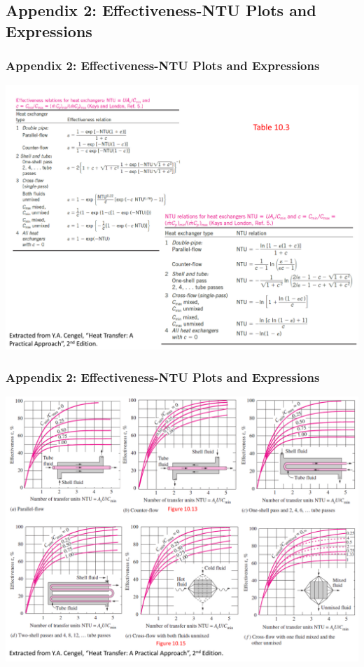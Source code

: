 \documentclass[10pt,compress,unknownkeysallowed]{beamer}
\begin{document}
\subsection{Appendix 2: Effectiveness-NTU Plots and Expressions}\label{appendix2}
\begin{frame}
  \frametitle{Appendix 2: Effectiveness-NTU Plots and Expressions}
    \begin{center}
         \includegraphics[width=1.\columnwidth,height=0.65\columnwidth,clip]{./Pics/HE_NTU1}
    \end{center}
\end{frame}
\begin{frame}
  \frametitle{Appendix 2: Effectiveness-NTU Plots and Expressions}
    \begin{center}
         \includegraphics[width=1.\columnwidth,height=0.65\columnwidth,clip]{./Pics/HE_NTU2}
    \end{center}
\end{frame}


%  
\end{document}
